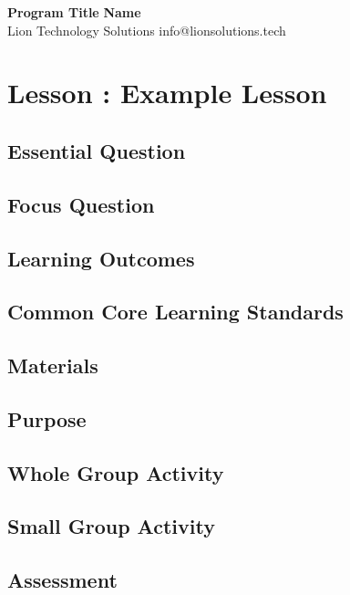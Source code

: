 \documentclass[a4paper, 11pt]{article}
\begin{document}
\vspace*{-0.75in}
\noindent\large\textbf{Program Title} \hfill \textbf{Name} \\
\normalsize {Lion Technology Solutions} \hfill info@lionsolutions.tech \\
\normalsize 

\section*{Lesson : Example Lesson}

\subsection*{Essential Question}


\subsection*{Focus Question}


\subsection*{Learning Outcomes}
 
 
\subsection*{Common Core Learning Standards}


\subsection*{Materials}


\subsection*{Purpose}


\subsection*{Whole Group Activity}


\subsection*{Small Group Activity}


\subsection*{Assessment}
\end{document}

